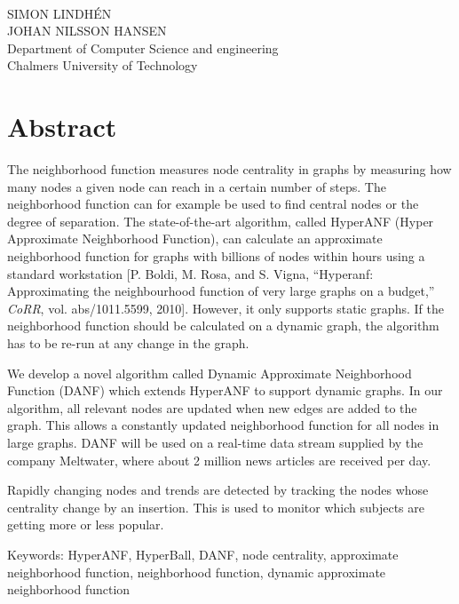 \maintitle\\
\subtitle\\
SIMON LINDHÉN\\
JOHAN NILSSON HANSEN\\
Department of Computer Science and engineering\\
Chalmers University of Technology \setlength{\parskip}{0.5cm}

\thispagestyle{plain}			%
\setlength{\parskip}{0pt plus 1.0pt}
\setlength{\parindent}{15pt}
\section*{Abstract}
The neighborhood function measures node centrality in graphs by measuring how many nodes a given node can reach in a certain number of steps. The neighborhood function can for example be used to find central nodes or the degree of separation. The state-of-the-art algorithm, called HyperANF (Hyper Approximate Neighborhood Function), can calculate an approximate neighborhood function for graphs with billions of nodes within hours using a standard workstation [P. Boldi, M. Rosa, and S. Vigna, “Hyperanf:  Approximating the neighbourhood function of very large graphs on a budget,” \textit{CoRR}, vol. abs/1011.5599, 2010]. However, it only supports static graphs. If the neighborhood function should be calculated on a dynamic graph, the algorithm has to be re-run at any change in the graph. 

We develop a novel algorithm called Dynamic Approximate Neighborhood Function (DANF) which extends HyperANF to support dynamic graphs. In our algorithm, all relevant nodes are updated when new edges are added to the graph. This allows a constantly updated neighborhood function for all nodes in large graphs. DANF will be used on a real-time data stream supplied by the company Meltwater, where about 2 million news articles are received per day.

Rapidly changing nodes and trends are detected by tracking the nodes whose centrality change by an insertion. This is used to monitor which subjects are getting more or less popular. 

\vfill
\noindent Keywords: HyperANF, HyperBall, DANF, node centrality, approximate neighborhood function, neighborhood function, dynamic approximate neighborhood function

\newpage				%
\thispagestyle{empty}
\mbox{}